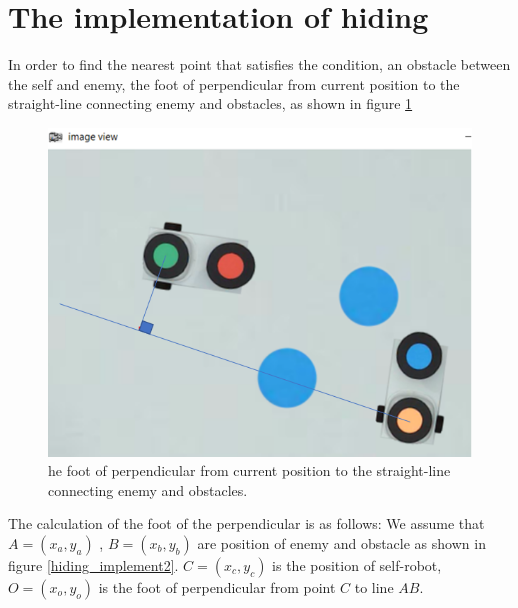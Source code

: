 \section{The implementation of hiding}
In order to find the nearest point that satisfies the condition, an obstacle between the self and enemy, the foot of perpendicular from current position to the straight-line connecting enemy and obstacles, as shown in figure \ref{hiding_implement1}

\begin{figure}[thb]
    \centering
    \includegraphics[width=1\textwidth]{images/implementofhiding1.png}
    \caption[he foot of perpendicular from current position to the straight-line connecting enemy and obstacles]{he foot of perpendicular from current position to the straight-line connecting enemy and obstacles.}\label{hiding_implement1}
\end{figure}

The calculation of the foot of the perpendicular is as follows:
We assume that $A=(x_{a},y_{a})$ ,  $B=(x_{b},y_{b})$ are position of enemy and obstacle as shown in figure \ref{hiding_implement2}. $C=(x_{c},y_{c})$ is the position of self-robot, $O=(x_{o},y_{o})$ is the foot of perpendicular from point $C$ to line $AB$.


